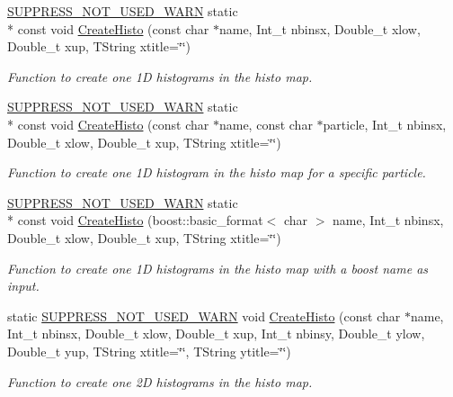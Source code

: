 \begin{DoxyCompactItemize}
\hyperlink{HistClass_8hh_a85edd6ac47f5ea2970c76af20855738c}{S\-U\-P\-P\-R\-E\-S\-S\-\_\-\-N\-O\-T\-\_\-\-U\-S\-E\-D\-\_\-\-W\-A\-R\-N} static \\*
const void \hyperlink{namespaceHistClass_ae4e9eec6f288b9e7e29575249bd720ae}{Create\-Histo} (const char $\ast$name, Int\-\_\-t nbinsx, Double\-\_\-t xlow, Double\-\_\-t xup, T\-String xtitle=\char`\"{}\char`\"{})
\begin{DoxyCompactList}\small\item\em Function to create one 1\-D histograms in the histo map. \end{DoxyCompactList}\item 
\hyperlink{HistClass_8hh_a85edd6ac47f5ea2970c76af20855738c}{S\-U\-P\-P\-R\-E\-S\-S\-\_\-\-N\-O\-T\-\_\-\-U\-S\-E\-D\-\_\-\-W\-A\-R\-N} static \\*
const void \hyperlink{namespaceHistClass_a291085c6bad7504d919689f5849c8bb9}{Create\-Histo} (const char $\ast$name, const char $\ast$particle, Int\-\_\-t nbinsx, Double\-\_\-t xlow, Double\-\_\-t xup, T\-String xtitle=\char`\"{}\char`\"{})
\begin{DoxyCompactList}\small\item\em Function to create one 1\-D histogram in the histo map for a specific particle. \end{DoxyCompactList}\item 
\hyperlink{HistClass_8hh_a85edd6ac47f5ea2970c76af20855738c}{S\-U\-P\-P\-R\-E\-S\-S\-\_\-\-N\-O\-T\-\_\-\-U\-S\-E\-D\-\_\-\-W\-A\-R\-N} static \\*
const void \hyperlink{namespaceHistClass_a4565ce8b0fdab8fa7c3e61a78eb470e1}{Create\-Histo} (boost\-::basic\-\_\-format$<$ char $>$ name, Int\-\_\-t nbinsx, Double\-\_\-t xlow, Double\-\_\-t xup, T\-String xtitle=\char`\"{}\char`\"{})
\begin{DoxyCompactList}\small\item\em Function to create one 1\-D histograms in the histo map with a boost name as input. \end{DoxyCompactList}\item 
static \hyperlink{HistClass_8hh_a85edd6ac47f5ea2970c76af20855738c}{S\-U\-P\-P\-R\-E\-S\-S\-\_\-\-N\-O\-T\-\_\-\-U\-S\-E\-D\-\_\-\-W\-A\-R\-N} void \hyperlink{namespaceHistClass_acc4b0ea574224d49b1aa9b1f4ae0facb}{Create\-Histo} (const char $\ast$name, Int\-\_\-t nbinsx, Double\-\_\-t xlow, Double\-\_\-t xup, Int\-\_\-t nbinsy, Double\-\_\-t ylow, Double\-\_\-t yup, T\-String xtitle=\char`\"{}\char`\"{}, T\-String ytitle=\char`\"{}\char`\"{})
\begin{DoxyCompactList}\small\item\em Function to create one 2\-D histograms in the histo map. \end{DoxyCompactList}\item 

\end{DoxyCompactItemize}
